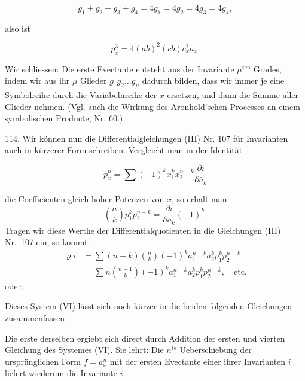 \[
g_1+g_2+g_3+g_4=4g_1=4g_2=4g_3=4g_4,
\]

also ist

\[
p_x^3=4(ab)^2(cb)c_x^2a_x.
\]

Wir schliessen: \glqq{}Die erste Evectante entsteht aus der Invariante $\mu^{\text{ten}}$ Grades, indem wir aus ihr $\mu$ Glieder $g_1g_2\ldots g_\mu$ dadurch bilden, dass wir immer je eine Symbolreihe durch die Variabelnreihe der $x$ ersetzen, und dann die Summe aller Glieder nehmen.\grqq{} (Vgl. auch die Wirkung des Aronhold'schen Processes an einem symbolischen Producte, Nr. 60.)

114.  Wir können nun die Differentialgleichungen (III) Nr. 107 für Invarianten auch in kürzerer Form schreiben. Vergleicht man in der Identität

\[
p_x^n=\sum(-1)^kx_1^kx_2^{n-k}\frac{\partial i}{\partial \bar a_k}
\]


die Coefficienten gleich hoher Potenzen von $x$, so erhält man:
\[
\binom{n}{k} p_1^k p_2^{n-k} = \frac{\partial i}{\partial \bar a_k} (-1)^k.
\]
Tragen wir diese Werthe der Differentialquotienten in die Gleichungen (III) Nr.~107 ein, so kommt:
\[
\begin{aligned}
\varrho i &= \sum (n-k) \binom{n}{k} (-1)^k a_1^{n-k} a_2^k p_1^k p_2^{n-k}\\
&= \sum n \binom{n-1}{k} (-1)^k a_1^{n-k} a_2^k p_1^k p_2^{n-k}, \quad \text{etc.}
\end{aligned}
\]
oder:

Dieses System (VI) lässt sich noch kürzer in die beiden folgenden Gleichungen zusammenfassen:

Die erste derselben ergiebt sich direct durch Addition der ersten und vierten Gleichung des Systemes (VI). Sie lehrt:
\glqq Die $n^{\text{te}}$ Ueberschiebung der ursprünglichen Form $f = a_x^n$ mit der ersten Evectante einer ihrer Invarianten $i$ liefert wiederum die Invariante $i$.\grqq{}


